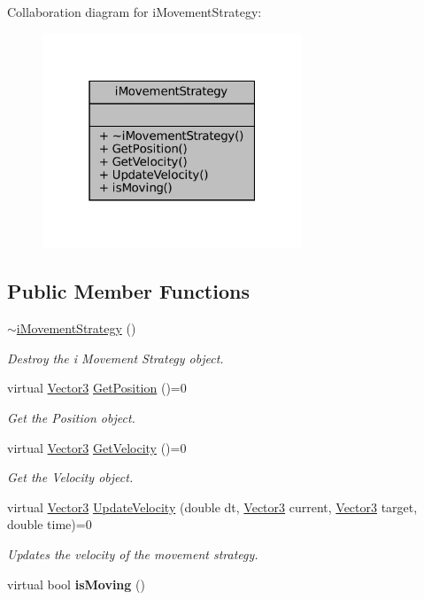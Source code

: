 Collaboration diagram for i\+Movement\+Strategy\+:\nopagebreak
\begin{figure}[H]
\begin{center}
\leavevmode
\includegraphics[width=220pt]{classiMovementStrategy__coll__graph}
\end{center}
\end{figure}
\subsection*{Public Member Functions}
\begin{DoxyCompactItemize}
\item 
\mbox{\label{classiMovementStrategy_a715d79c2ed2353d1f38359398d6b5c88}} 
\hyperlink{classiMovementStrategy_a715d79c2ed2353d1f38359398d6b5c88}{$\sim$i\+Movement\+Strategy} ()
\begin{DoxyCompactList}\small\item\em Destroy the i Movement Strategy object. \end{DoxyCompactList}\item 
virtual \hyperlink{classVector3}{Vector3} \hyperlink{classiMovementStrategy_aa9f5a07461c654a7497775696d20e990}{Get\+Position} ()=0
\begin{DoxyCompactList}\small\item\em Get the Position object. \end{DoxyCompactList}\item 
virtual \hyperlink{classVector3}{Vector3} \hyperlink{classiMovementStrategy_a92f20c8ebf7c4f7dde5743528b8e45b7}{Get\+Velocity} ()=0
\begin{DoxyCompactList}\small\item\em Get the Velocity object. \end{DoxyCompactList}\item 
virtual \hyperlink{classVector3}{Vector3} \hyperlink{classiMovementStrategy_a40ec6c329ca0842638af80cfd509b372}{Update\+Velocity} (double dt, \hyperlink{classVector3}{Vector3} current, \hyperlink{classVector3}{Vector3} target, double time)=0
\begin{DoxyCompactList}\small\item\em Updates the velocity of the movement strategy. \end{DoxyCompactList}\item 
\mbox{\label{classiMovementStrategy_a7933e9aa7f39f5b71095a993d63e12c6}} 
virtual bool {\bfseries is\+Moving} ()
\end{DoxyCompactItemize}


